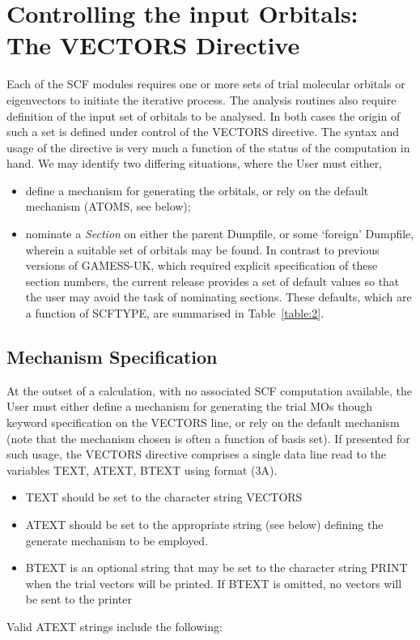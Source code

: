 \documentclass[11pt,fleqn]{article}
\begin{document}
\section[Controlling the input Orbitals: The VECTORS Directive]{Controlling the input Orbitals: \protect \\ The VECTORS Directive}

Each of the SCF modules requires one or more sets of trial molecular
orbitals or eigenvectors to initiate the iterative process. The analysis
routines also require definition of the input set of orbitals to be
analysed. In both cases the origin of such a set is defined under control
of the VECTORS directive. The syntax and usage of the directive is very
much a function of the status of the computation in hand. We may identify
two differing situations, where the User must either,

\begin{itemize}
\item  define a mechanism for generating the orbitals, or rely on the
default mechanism (ATOMS, see below);
\item nominate a {\em Section}  on either the parent Dumpfile, or some
`foreign' Dumpfile, wherein a suitable set of orbitals may be found.
In contrast to previous versions of GAMESS-UK, which required explicit
specification of these section numbers, the current release provides a
set of default values so that the user may avoid the task of nominating
sections. These defaults, which are a function of SCFTYPE, are summarised
in Table~\ref{table:2}.
\end{itemize}
 

\subsection[Mechanism Specification]{Mechanism Specification}

At the outset of a calculation, with no associated SCF
computation available, the User must either define a mechanism
for generating the trial MOs though keyword specification
on the VECTORS line, or rely on the default mechanism (note
that the mechanism chosen is often a function of basis set).
If presented for such usage, the VECTORS directive comprises a single data line
read to the variables TEXT, ATEXT, BTEXT using format (3A).
\begin{itemize}
\item TEXT should be set to the character string VECTORS
\item ATEXT should be set to the appropriate string (see below)
defining the generate mechanism to be employed.
\item BTEXT is an optional string that may be set to the character
string PRINT when the trial vectors will be printed. If BTEXT is
omitted, no vectors will be sent to the printer
\end{itemize}
Valid ATEXT strings include the following:
\end{document}
